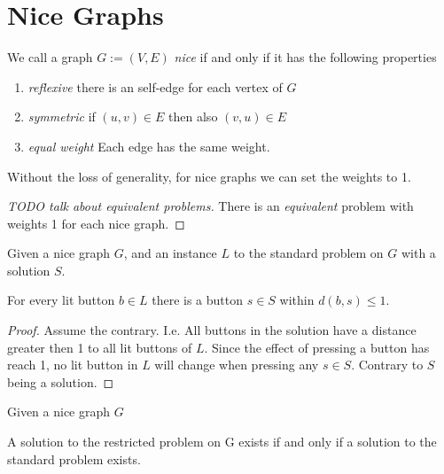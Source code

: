 \section{Nice Graphs}
We call a graph $G:=(V, E)$ \emph{nice} if and only if it has the following properties

\begin{enumerate}
    \item \emph{reflexive} there is an self-edge for each vertex of $G$
    \item \emph{symmetric} if $(u,v)\in E$ then also $(v,u)\in E$
    \item \emph{equal weight} Each edge has the same weight.
\end{enumerate}

Without the loss of generality, for nice graphs we can set the weights to 1.

\begin{proof}[TODO talk about equivalent problems]
    There is an \emph{equivalent} problem with weights 1 for each nice graph.
\end{proof}

\begin{lemma}\label{close-press-button}
    Given a nice graph $G$, and an instance $L$ to the standard problem on $G$ with a solution $S$.

    For every lit button $b\in L$ there is a button $s\in S$ within $d(b,s) \leq 1$. 
\end{lemma}

\begin{proof}
    Assume the contrary. I.e. All buttons in the solution have a distance greater then 1 to all lit buttons of $L$. Since the effect of pressing a button has reach 1, no lit button in $L$ will change when pressing any $s\in S$.
    Contrary to $S$ being a solution.
\end{proof}

\begin{lemma}\label{restricted-solution}
    Given a nice graph $G$

    A solution to the restricted problem on G exists if and only if a solution to the standard problem exists.
\end{lemma}

